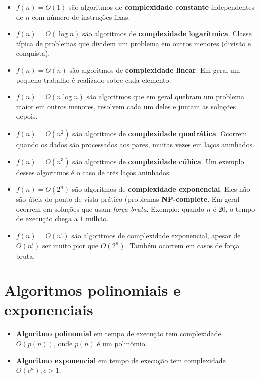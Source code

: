 \begin{itemize}
\item $f(n) = O(1)$ são algoritmos de {\bf complexidade constante}
independentes de $n$ com número de instruções fixas.

\item $f(n) = O(\log n)$ são algoritmos de {\bf complexidade logarítmica}.
Classe típica de problemas que dividem um problema em outros menores (divisão e conquista).

\item $f(n) = O(n)$ são algoritmos de {\bf complexidade linear}. Em geral 
um pequeno trabalho é realizado sobre cada elemento.

\item $f(n) = O(n \log n)$ são algoritmos que em geral quebram um problema maior em outros
menores, resolvem cada um deles e juntam as soluções depois.

\item $f(n) = O(n^2)$ são algoritmos de {\bf complexidade quadrática}. 
Ocorrem quando os dados são processados aos pares, muitas vezes em laços aninhados.

\item $f(n) = O(n^3)$ são algoritmos de \textbf{complexidade cúbica}. Um exemplo
desses algoritmos é o caso de três laços aninhados.

\item $f(n) = O(2^n)$ são algoritmos de \textbf{complexidade exponencial}. Eles
não são úteis do ponto de vista prático (problemas \textbf{NP-complete}.
Em geral ocorrem em soluções que usam \textit{força bruta}. Exemplo: quando $n$ é 20,
o tempo de execução chega a $1$ milhão.

\item $f(n) = O(n!)$ são algoritmos de complexidade exponencial, apesar
de $O(n!)$ ser muito pior que $O(2^n)$. Também ocorrem em casos de força bruta.
\end{itemize}

\section{Algoritmos polinomiais e exponenciais}

\begin{itemize}
\item {\bf Algoritmo polinomial} em tempo de execução tem complexidade $O(p(n))$, onde $p(n)$ é um polinômio.
\item {\bf Algoritmo exponencial} em tempo de execução tem complexidade $O(c^n), c > 1$.
\end{itemize}

